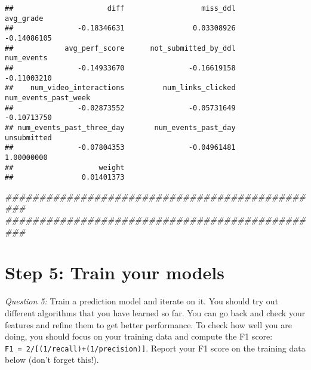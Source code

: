 \documentclass[
]{article}
\newenvironment{Shaded}{\begin{snugshade}}{\end{snugshade}}
\newcommand{\CommentTok}[1]{\textcolor[rgb]{0.56,0.35,0.01}{\textit{#1}}}
\newcommand{\DataTypeTok}[1]{\textcolor[rgb]{0.13,0.29,0.53}{#1}}
\newcommand{\KeywordTok}[1]{\textcolor[rgb]{0.13,0.29,0.53}{\textbf{#1}}}
\newcommand{\NormalTok}[1]{#1}
\newcommand{\OperatorTok}[1]{\textcolor[rgb]{0.81,0.36,0.00}{\textbf{#1}}}
\newcommand{\RegionMarkerTok}[1]{#1}
\newcommand{\StringTok}[1]{\textcolor[rgb]{0.31,0.60,0.02}{#1}}
\begin{document}
\begin{verbatim}
##                      diff                  miss_ddl                 avg_grade 
##               -0.18346631                0.03308926               -0.14086105 
##            avg_perf_score      not_submitted_by_ddl                num_events 
##               -0.14933670               -0.16619158               -0.11003210 
##    num_video_interactions         num_links_clicked      num_events_past_week 
##               -0.02873552               -0.05731649               -0.10713750 
## num_events_past_three_day       num_events_past_day               unsubmitted 
##               -0.07804353               -0.04961481                1.00000000 
##                    weight 
##                0.01401373
\end{verbatim}

\begin{Shaded}
\begin{Highlighting}[]
\CommentTok{###############################################}
\CommentTok{###############################################}
\end{Highlighting}
\end{Shaded}

\hypertarget{step-5-train-your-models}{%
\section{Step 5: Train your models}\label{step-5-train-your-models}}

\emph{Question 5:} Train a prediction model and iterate on it. You
should try out different algorithms that you have learned so far. You
can go back and check your features and refine them to get better
performance. To check how well you are doing, you should focus on your
training data and compute the F1 score:
\texttt{F1\ =\ 2/{[}(1/recall)+(1/precision){]}}. Report your F1 score
on the training data below (don't forget this!).

\begin{Shaded}
\end{Shaded}
\end{document}
